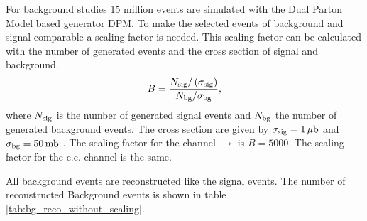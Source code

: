 For background studies 15 million events are simulated with the Dual Parton Model based generator DPM.
To make the selected events of background and signal comparable a scaling factor is needed.
This scaling factor can be calculated with the number of generated events and the cross section of signal and background.
\begin{equation}
		B = \frac{N_{\textnormal{sig}}/\left(\sigma_{\textnormal{sig}}\right)}{N_{\textnormal{bg}}/\sigma_{\textnormal{bg}}},
\label{eq:bg_scaling}
\end{equation}
where $N_{\textnormal{sig}}$ is the number of generated signal events and $N_{\textnormal{bg}}$ the number of generated background events.
The cross section are given by $\sigma_{\textnormal{sig}} = 1\,\mu\textnormal{b}$ and $\sigma_{\textnormal{bg}} = 50\, \textnormal{mb}$ \cite{PANDAphysics2009}.
The scaling factor for the channel \pbarpSystem $\rightarrow$ \excitedcascade \anticascade is $B=5000$.
The scaling factor for the c.c. channel is the same. 

%		 

All background events are reconstructed like the signal events. 
The number of reconstructed Background events is shown in table \ref{tab:bg_reco_without_scaling}.

